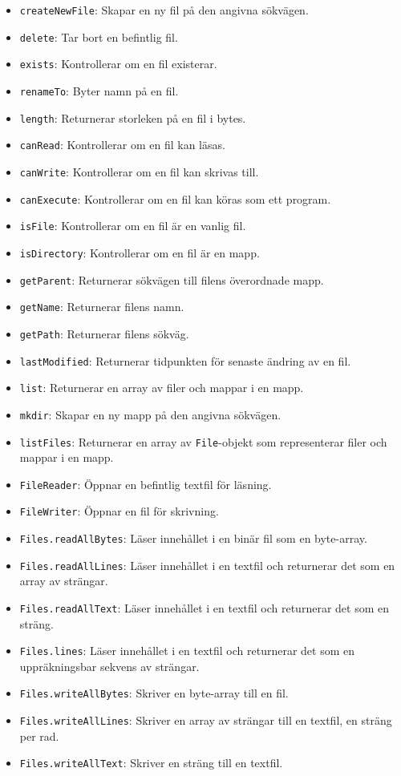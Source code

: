 \begin{itemize}
\tightlist
\item
  \texttt{createNewFile}: Skapar en ny fil på den angivna sökvägen.
\item
  \texttt{delete}: Tar bort en befintlig fil.
\item
  \texttt{exists}: Kontrollerar om en fil existerar.
\item
  \texttt{renameTo}: Byter namn på en fil.
\item
  \texttt{length}: Returnerar storleken på en fil i bytes.
\item
  \texttt{canRead}: Kontrollerar om en fil kan läsas.
\item
  \texttt{canWrite}: Kontrollerar om en fil kan skrivas till.
\item
  \texttt{canExecute}: Kontrollerar om en fil kan köras som ett program.
\item
  \texttt{isFile}: Kontrollerar om en fil är en vanlig fil.
\item
  \texttt{isDirectory}: Kontrollerar om en fil är en mapp.
\item
  \texttt{getParent}: Returnerar sökvägen till filens överordnade mapp.
\item
  \texttt{getName}: Returnerar filens namn.
\item
  \texttt{getPath}: Returnerar filens sökväg.
\item
  \texttt{lastModified}: Returnerar tidpunkten för senaste ändring av en
  fil.
\item
  \texttt{list}: Returnerar en array av filer och mappar i en mapp.
\item
  \texttt{mkdir}: Skapar en ny mapp på den angivna sökvägen.
\item
  \texttt{listFiles}: Returnerar en array av \texttt{File}-objekt som
  representerar filer och mappar i en mapp.
\item
  \texttt{FileReader}: Öppnar en befintlig textfil för läsning.
\item
  \texttt{FileWriter}: Öppnar en fil för skrivning.
\item
  \texttt{Files.readAllBytes}: Läser innehållet i en binär fil som en
  byte-array.
\item
  \texttt{Files.readAllLines}: Läser innehållet i en textfil och
  returnerar det som en array av strängar.
\item
  \texttt{Files.readAllText}: Läser innehållet i en textfil och
  returnerar det som en sträng.
\item
  \texttt{Files.lines}: Läser innehållet i en textfil och returnerar det
  som en uppräkningsbar sekvens av strängar.
\item
  \texttt{Files.writeAllBytes}: Skriver en byte-array till en fil.
\item
  \texttt{Files.writeAllLines}: Skriver en array av strängar till en
  textfil, en sträng per rad.
\item
  \texttt{Files.writeAllText}: Skriver en sträng till en textfil.
\end{itemize}

